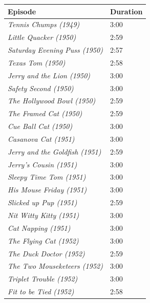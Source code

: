 \documentclass[report, 11pt, oneside]{dissertation}
\begin{document}
\begin{table}[]
\begin{tabular}{l|l|}
\hline
\multicolumn{1}{|l|}{Episode} & Duration \\ \hline
\multicolumn{1}{|l|}{\textit{Tennis Chumps (1949)}} & 3:00 \\ \hline
\multicolumn{1}{|l|}{\textit{Little Quacker (1950)}} & 2:59 \\ \hline
\multicolumn{1}{|l|}{\textit{Saturday Evening Puss (1950)}} & 2:57 \\ \hline
\multicolumn{1}{|l|}{\textit{Texas Tom (1950)}} & 2:58 \\ \hline
\multicolumn{1}{|l|}{\textit{Jerry and the Lion (1950)}} & 3:00 \\ \hline
\multicolumn{1}{|l|}{\textit{Safety Second (1950)}} & 3:00 \\ \hline
\multicolumn{1}{|l|}{\textit{The Hollywood Bowl (1950)}} & 2:59 \\ \hline
\multicolumn{1}{|l|}{\textit{The Framed Cat (1950)}} & 2:59 \\ \hline
\multicolumn{1}{|l|}{\textit{Cue Ball Cat (1950)}} & 3:00 \\ \hline
\multicolumn{1}{|l|}{\textit{Casanova Cat (1951)}} & 3:00 \\ \hline
\multicolumn{1}{|l|}{\textit{Jerry and the Goldfish (1951)}} & 2:59 \\ \hline
\multicolumn{1}{|l|}{\textit{Jerry's Cousin (1951)}} & 3:00 \\ \hline
\multicolumn{1}{|l|}{\textit{Sleepy Time Tom (1951)}} & 3:00 \\ \hline
\multicolumn{1}{|l|}{\textit{His Mouse Friday (1951)}} & 3:00 \\ \hline
\multicolumn{1}{|l|}{\textit{Slicked up Pup (1951)}} & 2:59 \\ \hline
\multicolumn{1}{|l|}{\textit{Nit Witty Kitty (1951)}} & 3:00 \\ \hline
\multicolumn{1}{|l|}{\textit{Cat Napping (1951)}} & 3:00 \\ \hline
\multicolumn{1}{|l|}{\textit{The Flying Cat (1952)}} & 3:00 \\ \hline
\multicolumn{1}{|l|}{\textit{The Duck Doctor (1952)}} & 2:59 \\ \hline
\multicolumn{1}{|l|}{\textit{The Two Mouseketeers (1952)}} & 3:00 \\ \hline
\multicolumn{1}{|l|}{\textit{Triplet Trouble (1952)}} & 3:00 \\ \hline
\multicolumn{1}{|l|}{\textit{Fit to be Tied (1952)}} & 2:58 \\ \hline

\end{tabular}
\end{table}
\end{document}

